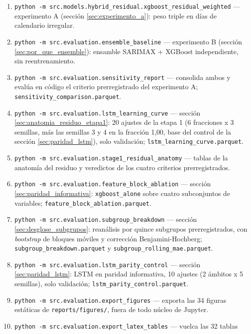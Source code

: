 \begin{sloppypar}
{\begin{enumerate}[nosep]
    \texttt{full\_comparison.parquet}, contra la que se verifican la ablación de bloques y
    el cuaderno principal de flujo.
  \item \texttt{python -m src.models.hybrid\_residual.xgboost\_residual\_weighted} —
    experimento A (sección \ref{sec:experimento_a}): peso triple en días de calendario
    irregular.
  \item \texttt{python -m src.evaluation.ensemble\_baseline} — experimento B (sección
    \ref{sec:por_que_ensemble}): ensamble SARIMAX + XGBoost independiente, sin reentrenamiento.
  \item \texttt{python -m src.evaluation.sensitivity\_report} — consolida ambos y evalúa
    en código el criterio prerregistrado del experimento A;
    \texttt{sensitivity\_comparison.parquet}.
  \item \texttt{python -m src.evaluation.lstm\_learning\_curve} — sección
    \ref{sec:anatomia_residuo_etapa1}: 20 ajustes de la etapa 1 (6 fracciones x 3
    semillas, más las semillas 3 y 4 en la fracción 1,00, base del control de la sección
    \ref{sec:paridad_lstm}), solo validación; \texttt{lstm\_learning\_curve.parquet}.
  \item \texttt{python -m src.evaluation.stage1\_residual\_anatomy} — tablas de la
    anatomía del residuo y veredictos de los cuatro criterios prerregistrados.
  \item \texttt{python -m src.evaluation.feature\_block\_ablation} — sección
    \ref{sec:paridad_informativa}: \texttt{xgboost\_alone} sobre cuatro subconjuntos de
    variables; \texttt{feature\_block\_ablation.parquet}.
  \item \texttt{python -m src.evaluation.subgroup\_breakdown} — sección
    \ref{sec:desglose_subgrupos}: reanálisis por quince subgrupos prerregistrados, con
    \emph{bootstrap} de bloques móviles y corrección Benjamini-Hochberg;
    \texttt{subgroup\_breakdown.parquet} y \texttt{subgroup\_rolling\_mae.parquet}.
  \item \texttt{python -m src.evaluation.lstm\_parity\_control} — sección
    \ref{sec:paridad_lstm}: LSTM en paridad informativa, 10 ajustes (2 ámbitos x 5
    semillas), solo validación; \texttt{lstm\_parity\_control.parquet}.
  \item \texttt{python -m src.evaluation.export\_figures} — exporta las 34 figuras
    estáticas de \texttt{reports/\allowbreak{}figures/}, fuera de todo núcleo de Jupyter.
  \item \texttt{python -m src.evaluation.export\_latex\_tables} — vuelca las 32 tablas

\end{enumerate}}
\end{sloppypar}
